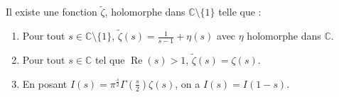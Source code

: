   \begin{theorem}
    Il existe une fonction $\widetilde{\zeta}$, holomorphe dans $\mathbb{C} \setminus \{ 1 \}$ telle que :
    \begin{enumerate}[label=(\roman*)]
      \item Pour tout $s \in \mathbb{C} \setminus \{ 1 \}$, $\widetilde{\zeta}(s) = \frac{1}{s-1} + \eta(s)$ avec $\eta$ holomorphe dans $\mathbb{C}$.
      \item Pour tout $s \in \mathbb{C}$ tel que $\operatorname{Re}(s) > 1$, $\widetilde{\zeta}(s) = \zeta(s)$.
      \item En posant $I(s) = \pi^{\frac{s}{2}} \Gamma \left( \frac{s}{2} \right) \zeta(s)$, on a $I(s) = I(1-s)$.
    \end{enumerate}
  \end{theorem}

